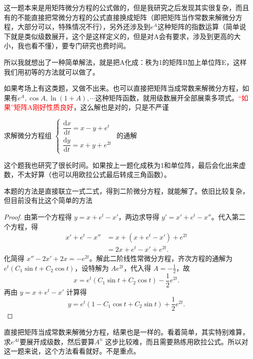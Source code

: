\begin{remark}
这一题本来是用矩阵微分方程的公式做的，但是我研究之后发现其实很复杂，而且有的不能直接把常微分方程的公式直接换成矩阵（即把矩阵当作常数来解微分方程，大部分可以，特殊情况不行），另外还涉及到$e^{A}$这种矩阵的指数运算（简单说下就是类似级数展开，这个是这样定义的，但是对A会有要求，涉及到更高的大小，我也看不懂），要专门研究也费时间。

所以我就想出了一种简单解法，就是把A化成：秩为1的矩阵B加上单位阵E，这样我们用初等的方法就可以做了。

如果考场上有这类题，又做不出来。也可以直接把矩阵当成常数来解微分方程，如果有$e^A,\cos A,\ln(1+A),\cdots$这种矩阵函数，就用级数展开全部展乘多项式。\textcolor{red}{“如果”矩阵A刚好性质良好}，这么解也是对的，只是不严谨
\end{remark}


\vspace{2mm}
\begin{example}[复旦2016]
求解微分方程组
$\begin{cases}
\dfrac{\mathrm{d}x}{\mathrm{d}t} = x - y + e^{t}\\
\dfrac{\mathrm{d}y}{\mathrm{d}t} = x + y + e^{2t}
\end{cases}$
的通解
\end{example}

\begin{remark}
这个题我也研究了很长时间。如果按上一题化成秩为1和单位阵，最后会化出来虚数，不太好算（也可以用欧拉公式最后转成三角函数）。

本题的方法是直接联立一式二式，得到二阶微分方程，就能解了。依旧比较复杂，但目前没有比这个简单的方法
\end{remark}

\begin{proof}
由第一个方程得 $y = x + e^t - x'$，两边求导得 $y' = x' + e^t - x''$。代入第二个方程，得
\begin{align*}
x' + e^t - x'' &= x + (x + e^t - x') + e^{2t} \\
&= 2x + e^t - x' + e^{2t}.
\end{align*}
化简得 $x'' - 2x' + 2x = -e^{2t}$。解此二阶线性常微分方程，齐次方程的通解为 $e^t(C_1\sin t + C_2\cos t)$，设特解为 $Ae^{2t}$，代入得 $A = -\frac12$，故
\[
x = e^t(C_1\sin t + C_2\cos t) - \frac12 e^{2t}.
\]
再由 $y = x + e^t - x'$ 计算得
\[
y = e^t(1 - C_1\cos t + C_2\sin t) + \frac12 e^{2t}.
\]
\end{proof}


\begin{remark}
直接把矩阵当成常数来解微分方程，结果也是一样的。看着简单，其实特别难算，求$e^{At} $要展开成级数，然后要算$ A^n$ 这步比较难，而且需要熟练用欧拉公式。所以对这一题来说，这个方法看看就好。不是重点。
\end{remark}


